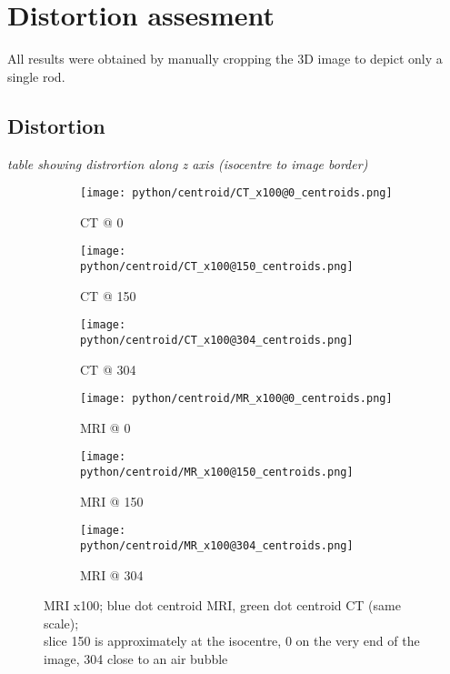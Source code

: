 \section{Distortion assesment}
All results were obtained by manually cropping the 3D image to depict only a single rod.
\subsection{Distortion}

\vspace{4cm}
\textit{table showing distrortion along z axis (isocentre to image border)}
\vspace{2cm}

\begin{figure}[!tbp]
  \begin{subfigure}[b]{0.32\textwidth}
    \texttt{[image: python/centroid/CT\_x100@0\_centroids.png]}
    \caption{CT @ 0}
    \label{fig:CT_x100_centroids@0}
  \end{subfigure}
  \begin{subfigure}[b]{0.32\textwidth}
    \texttt{[image: python/centroid/CT\_x100@150\_centroids.png]}
    \caption{CT @ 150}
    \label{fig:CT_x100_centroids@150}
  \end{subfigure}
  \begin{subfigure}[b]{0.32\textwidth}
    \texttt{[image: python/centroid/CT\_x100@304\_centroids.png]}
    \caption{CT @ 304}
    \label{fig:CT_x100_centroids@304}
  \end{subfigure}
  \begin{subfigure}[b]{0.32\textwidth}
    \texttt{[image: python/centroid/MR\_x100@0\_centroids.png]}
    \caption{MRI @ 0}
    \label{fig:MR_x100_centroids@0}
  \end{subfigure}
  \begin{subfigure}[b]{0.32\textwidth}
    \texttt{[image: python/centroid/MR\_x100@150\_centroids.png]}
    \caption{MRI @ 150}
    \label{fig:MR_x100_centroids@150}
  \end{subfigure}
  \begin{subfigure}[b]{0.32\textwidth}
    \texttt{[image: python/centroid/MR\_x100@304\_centroids.png]}
    \caption{MRI @ 304}
    \label{fig:MR_x100_centroids@304}
  \end{subfigure}
  \caption{MRI x100; blue dot centroid MRI, green dot centroid CT (same scale);\\ slice 150 is approximately at the isocentre, 0 on the very end of the image, 304 close to an air bubble}
  \label{fig:MR_x100_centroids}
\end{figure}

